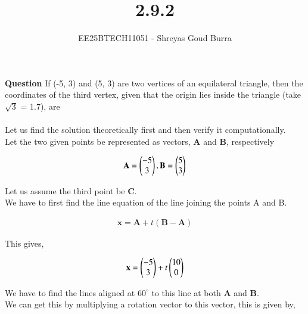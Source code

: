 \documentclass[journal]{IEEEtran}
\begin{document}

\vspace{3cm}

\title{2.9.2}
\author{EE25BTECH11051 - Shreyas Goud Burra}
\maketitle
{\let\newpage\relax\maketitle}

\renewcommand{\thefigure}{\theenumi}
\renewcommand{\thetable}{\theenumi}
\setlength{\intextsep}{10pt}


\renewcommand{\thetable}{\theenumi}

\textbf{Question}
If (-5, 3) and (5, 3) are two vertices of an equilateral triangle, then the
coordinates of the third vertex, given that the origin lies inside the triangle (take $\sqrt{3}$ = 1.7), are\\

\solution\\

Let us find the solution theoretically first and then verify it computationally.\\
Let the two given points be represented as vectors, \textbf{A} and \textbf{B}, respectively

\begin{align}
    \textbf{A} = \begin{pmatrix}-5\\3\end{pmatrix}, \textbf{B} = \begin{pmatrix}5\\3\end{pmatrix}
    \label{0.1}
\end{align}

Let us assume the third point be \textbf{C}.\\
We have to first find the line equation of the line joining the points A and B.

\begin{align}
    \textbf{x} = \textbf{A} + t(\textbf{B}-\textbf{A})
    \label{0.2}
\end{align}

This gives,

\begin{align}
    \textbf{x} = \begin{pmatrix}-5\\3\end{pmatrix}+t\begin{pmatrix}10\\0\end{pmatrix}
    \label{0.3}
\end{align}

We have to find the lines aligned at $60^{\circ}$ to this line at both \textbf{A} and \textbf{B}.\\
We can get this by multiplying a rotation vector to this vector, this is given by,
\end{document}

